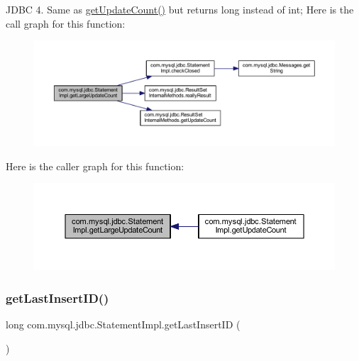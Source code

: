 J\+D\+BC 4. Same as \mbox{\hyperlink{classcom_1_1mysql_1_1jdbc_1_1_statement_impl_a5e320d2717fe1d637befef4f837719b6}{get\+Update\+Count()}} but returns long instead of int; Here is the call graph for this function\+:
\nopagebreak
\begin{figure}[H]
\begin{center}
\leavevmode
\includegraphics[width=350pt]{classcom_1_1mysql_1_1jdbc_1_1_statement_impl_a49c1971a757125e970b073a7b7295a14_cgraph}
\end{center}
\end{figure}
Here is the caller graph for this function\+:
\nopagebreak
\begin{figure}[H]
\begin{center}
\leavevmode
\includegraphics[width=350pt]{classcom_1_1mysql_1_1jdbc_1_1_statement_impl_a49c1971a757125e970b073a7b7295a14_icgraph}
\end{center}
\end{figure}
\mbox{\label{classcom_1_1mysql_1_1jdbc_1_1_statement_impl_a0eb045b9ef9a169ee226b5c7b0dd7e05}} 
\subsubsection{\texorpdfstring{get\+Last\+Insert\+I\+D()}{getLastInsertID()}}
{\footnotesize\ttfamily long com.\+mysql.\+jdbc.\+Statement\+Impl.\+get\+Last\+Insert\+ID (\begin{DoxyParamCaption}{ }\end{DoxyParamCaption})}

